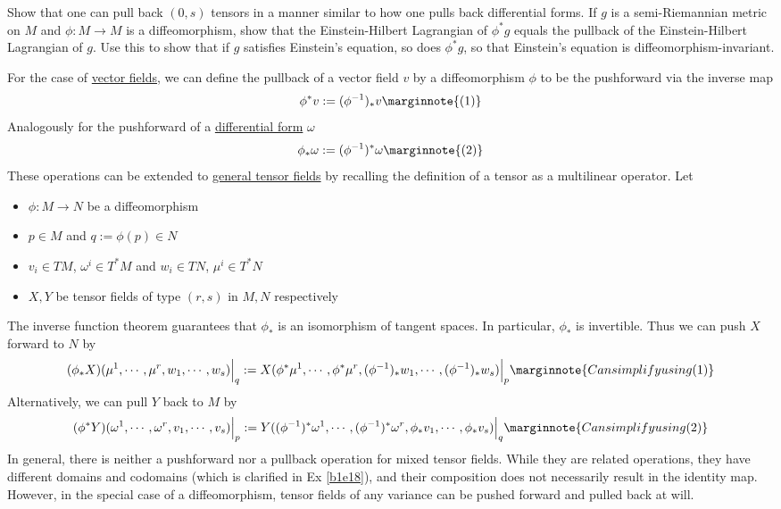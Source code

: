 \documentclass[10pt]{article}
\begin{document}
\begin{example}
	Show that one can pull back $(0, s)$ tensors in a manner similar to how one pulls back differential forms. If $g$ is a semi-Riemannian metric on $M$ and $\phi: M\to M$ is a diffeomorphism, show that the Einstein-Hilbert Lagrangian of $\phi^* g$ equals the pullback of the Einstein-Hilbert Lagrangian of $g$. Use this to show that if $g$ satisfies Einstein's equation, so does $\phi^* g$, so that Einstein's equation is diffeomorphism-invariant.
\end{example}
\sol For the case of \underline{vector fields}, we can define the pullback of a vector field $v$ by a diffeomorphism $\phi$ to be the pushforward via the inverse map
$$
\phi^*v := (\phi^{-1})_*v\marginnote{(1)}
$$
Analogously for the pushforward of a \underline{differential form} $\omega$
$$
\phi_*\omega := (\phi^{-1})^*\omega\marginnote{(2)}
$$
These operations can be extended to \underline{general tensor fields} by recalling the definition of a tensor as a multilinear operator. Let 
\begin{itemize}
	\item $\phi:M\to N$ be a diffeomorphism
	\item $p\in M$ and $q:=\phi(p)\in N$
	\item $v_i \in TM$, $\omega^i\in T^*M$ and $w_i \in TN$, $\mu^i\in T^*N$
	\item $X, Y$ be tensor fields of type $(r,s)$ in $M, N$ respectively
\end{itemize}
The inverse function theorem guarantees that $\phi_*$ is an isomorphism of tangent spaces. In particular, $\phi_*$ is invertible. Thus we can push $X$ forward to $N$ by
$$
(\phi_*X)(\mu^1,\cdots,\mu^r,w_1,\cdots,w_s)\Big|_q := X(\phi^*\mu^1,\cdots,\phi^*\mu^r,(\phi^{-1})_*w_1,\cdots,(\phi^{-1})_*w_s)\Big|_p\marginnote{Can simplify using (1)}
$$
Alternatively, we can pull $Y$ back to $M$ by
$$
(\phi^*Y)(\omega^1,\cdots,\omega^r,v_1,\cdots,v_s)\Big|_p := Y((\phi^{-1})^*\omega^1,\cdots,(\phi^{-1})^*\omega^r,\phi_*v_1,\cdots,\phi_*v_s)\Big|_q\marginnote{Can simplify using (2)}
$$
In general, there is neither a pushforward nor a pullback operation for mixed tensor fields. While they are related operations, they have different domains and codomains (which is clarified in Ex \ref{b1e18}), and their composition does not necessarily result in the identity map. However, in the special case of a diffeomorphism, tensor fields of any variance can be pushed forward and pulled back at will.\\\\
\end{document}
